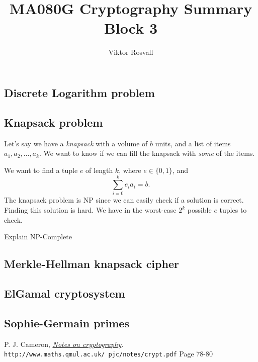 \documentclass[12pt]{article}
\title{MA080G Cryptography Summary Block 3}
\author{Viktor Rosvall}
\begin{document}
	\maketitle
	
	
	\subsection*{Discrete Logarithm problem}
	
	
	\subsection*{Knapsack problem \cite{knapsack-problem}}
	Let's say we have a \textit{knapsack} with a volume of $b$ units, and a list of items $a_1, a_2,...,a_k$. We want to know if we can fill the knapsack with \textit{some} of the items. 
	
	We want to find a tuple $e$ of length $k$, where $e \in \{0,1\}$, and 
	$$
	\sum_{i = 0}^{k}e_ia_i = b.
	$$
	The knapsack problem is NP since we can easily check if a solution is correct. Finding this solution is hard. We have in the worst-case $2^k$ possible $e$ tuples to check. 
	
	Explain NP-Complete
	
	\subsection*{Merkle-Hellman knapsack cipher}
	
	
	\subsection*{ElGamal cryptosystem}
	
	
	\subsection*{Sophie-Germain primes}
		
	
	\newpage
	\begin{thebibliography}{99}
		
		P. J. Cameron, 
		\textit{\underline{Notes on cryptography}}.
		\\\texttt{http://www.maths.qmul.ac.uk/~pjc/notes/crypt.pdf}
		Page 78-80  
		
	\end{thebibliography}
\end{document}
